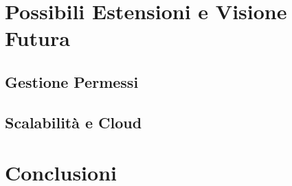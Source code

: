 \documentclass[12pt,a4paper]{report}
\begin{document}
\chapter{Possibili Estensioni e Visione Futura}
\label{cap:estensioni}

\section{Gestione Permessi}

\section{Scalabilità e Cloud}

\chapter*{Conclusioni}
\end{document}
